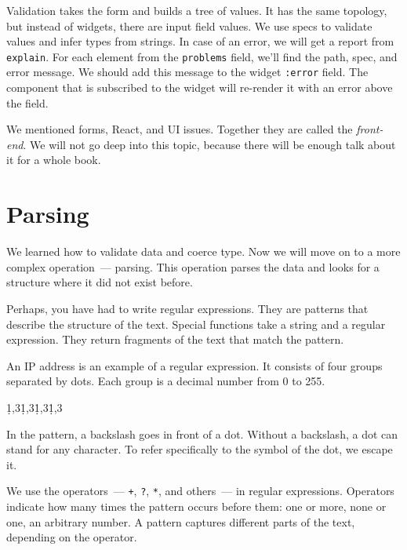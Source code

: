Validation takes the form and builds a tree of values. It has the same topology, but instead of widgets, there are input field values. We use specs to validate values and infer types from strings. In case of an error, we will get a report from \verb|explain|. For each element from the \verb|problems| field, we'll find the path, spec, and error message. We should add this message to the widget \verb|:error| field. The component that is subscribed to the widget will re-render it with an error above the field.


We mentioned forms, React, and UI issues. Together they are called the \emph{front-end}. We will not go deep into this topic, because there will be enough talk about it for a whole book.

\section{Parsing}

We learned how to validate data and coerce type. Now we will move on to a more complex operation~--- parsing. This operation parses the data and looks for a structure where it did not exist before.

Perhaps, you have had to write regular expressions. They are patterns that describe the structure of the text. Special functions take a string and a regular expression. They return fragments of the text that match the pattern.

An IP address is an example of a regular expression. It consists of four groups separated by dots. Each group is a decimal number from 0 to 255.


\begin{english}
  \begin{text}
\d{1,3}\.\d{1,3}\.\d{1,3}\.\d{1,3}
  \end{text}
\end{english}

In the pattern, a backslash goes in front of a dot. Without a backslash, a dot can stand for any character. To refer specifically to the symbol of the dot, we escape it.

We use the operators~--- \verb|+|, \verb|?|, \verb|*|, and others~--- in regular expressions. Operators indicate how many times the pattern occurs before them: one or more, none or one, an arbitrary number. A pattern captures different parts of the text, depending on the operator.

